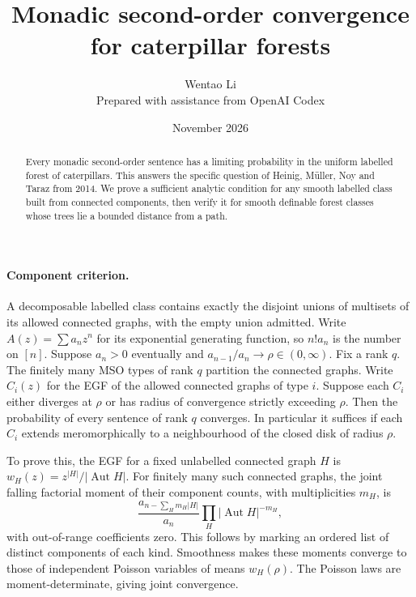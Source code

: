 \documentclass[11pt]{article}
\title{Monadic second-order convergence for caterpillar forests}
\author{Wentao Li\\[2pt]\small Prepared with assistance from OpenAI Codex}
\date{November 2026}
\begin{document}
\maketitle
\begin{abstract}
Every monadic second-order sentence has a limiting probability in the uniform labelled forest of caterpillars. This answers the specific question of Heinig, M\"uller, Noy and Taraz from 2014. We prove a sufficient analytic condition for any smooth labelled class built from connected components, then verify it for smooth definable forest classes whose trees lie a bounded distance from a path.
\end{abstract}

\paragraph{Component criterion.} A decomposable labelled class contains exactly the disjoint unions of multisets of its allowed connected graphs, with the empty union admitted. Write $A(z)=\sum a_nz^n$ for its exponential generating function, so $n!a_n$ is the number on $[n]$. Suppose $a_n>0$ eventually and $a_{n-1}/a_n\to\rho\in(0,\infty)$. Fix a rank $q$. The finitely many MSO types of rank $q$ partition the connected graphs. Write $C_i(z)$ for the EGF of the allowed connected graphs of type $i$. Suppose each $C_i$ either diverges at $\rho$ or has radius of convergence strictly exceeding $\rho$. Then the probability of every sentence of rank $q$ converges. In particular it suffices if each $C_i$ extends meromorphically to a neighbourhood of the closed disk of radius $\rho$.

To prove this, the EGF for a fixed unlabelled connected graph $H$ is $w_H(z)=z^{|H|}/|\operatorname{Aut}H|$. For finitely many such connected graphs, the joint falling factorial moment of their component counts, with multiplicities $m_H$, is
\[
 \frac{a_{n-\sum_H m_H|H|}}{a_n}
               \prod_H |\operatorname{Aut}H|^{-m_H},
\]
with out-of-range coefficients zero. This follows by marking an ordered list of distinct components of each kind. Smoothness makes these moments converge to those of independent Poisson variables of means $w_H(\rho)$. The Poisson laws are moment-determinate, giving joint convergence.
\end{document}
